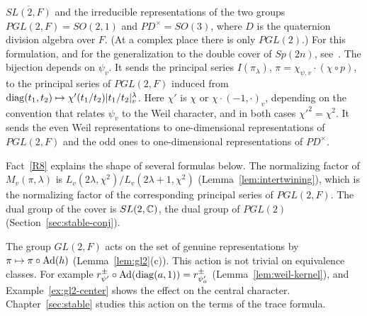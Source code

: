 \begin{enumerate}[label=(L\arabic*)]
  $\overline{SL(2,F)}$ and the irreducible representations of the two
  groups $PGL(2,F)=SO(2,1)$ and $PD^\times=SO(3)$, where $D$ is the
  quaternion division algebra over $F$. (At a complex place there is
  only $PGL(2)$.) For this formulation, and for the generalization to
  the double cover of $Sp(2n)$, see~\cite{GS12}. The bijection depends
  on $\psi_v$. It sends the principal series $I(\pi_\lambda)$,
  $\pi=\chi_{\psi,v}\cdot(\chi\circ p)$, to the principal series of
  $PGL(2,F)$ induced from $\operatorname{diag}(t_1,t_2)\mapsto\chi'(t_1/t_2)
  |t_1/t_2|_v^{\lambda}$. Here $\chi'$ is $\chi$ or $\chi\cdot(-1,\cdot)_v$,
  depending on the convention that relates $\psi_v$ to the Weil character,
  and in both cases $\chi'^2=\chi^2$. It sends the even Weil
  representations to one-dimensional representations of $PGL(2,F)$ and
  the odd ones to one-dimensional representations of $PD^\times$.
\end{enumerate}

Fact~\ref{R8} explains the shape of several formulas below. The
normalizing factor of $M_v(\pi,\lambda)$ is $L_v(2\lambda,\chi^2)/
L_v(2\lambda+1,\chi^2)$ (Lemma~\ref{lem:intertwining}), which is the
normalizing factor of the corresponding principal series of $PGL(2,F)$.
The dual group of the cover is $SL(2,\mathbb{C})$, the dual group of $PGL(2)$
(Section~\ref{sec:stable-conj}).

The group $GL(2,F)$ acts on the set of genuine representations by
$\pi\mapsto\pi\circ\operatorname{Ad}(h)$ (Lemma~\ref{lem:gl2}(c)). This action is not
trivial on equivalence classes. For example
$r^\pm_{\psi'}\circ\operatorname{Ad}(\operatorname{diag}(a,1))=r^\pm_{\psi'_a}$
(Lemma~\ref{lem:weil-kernel}), and Example~\ref{ex:gl2-center} shows the
effect on the central character. Chapter~\ref{sec:stable} studies this
action on the terms of the trace formula.

